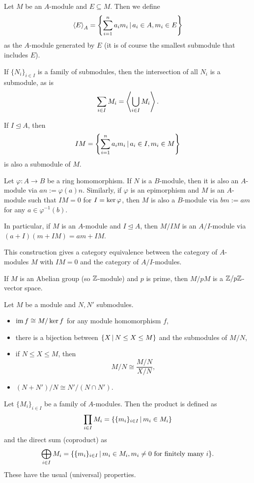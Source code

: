 Let $M$ be an $A$-module and $E \subseteq M$.
Then we define
\[
  \left< E \right>_A = \left\{
	\sum_{i=1}^n a_i m_i \,|\, a_i \in A, m_i \in E
  \right\}
\]
as the $A$-module generated by $E$ (it is of course the smallest submodule that
includes $E$).

If $\{N_i\}_{i\in I}$ is a family of submodules, then the intersection of all
$N_i$ is a submodule, as is
\[
  \sum_{i \in I} M_i = \left< \bigcup_{i \in I} M_i \right>.
\]

If $I \trianglelefteq A$, then
\[
  IM = \left\{
	\sum_{i=1}^n a_i m_i \,|\, a_i \in I, m_i \in M
  \right\}
\]
is also a submodule of $M$.

\begin{remark}
  Let $\varphi: A \to B$ be a ring homomorphism.
  If $N$ is a $B$-module, then it is also an $A$-module via $an := \varphi(a)
  n$.
  Similarly, if $\varphi$ is an epimorphism and $M$ is an $A$-module such that
  $IM = 0$ for $I = \operatorname{ker} \varphi$, then $M$ is also a $B$-module via $bm :=
  am$ for any $a \in \varphi^{-1}(b)$.
\end{remark}

\begin{remark}
  In particular, if $M$ is an $A$-module and $I \trianglelefteq A$, then $M /
  IM$ is an $A/I$-module via $(a+I)(m + IM) = am + IM$.
\end{remark}

\begin{remark}
  This construction gives a category equivalence between the category of
  $A$-modules $M$ with $IM = 0$ and the category of $A/I$-modules.
\end{remark}

\begin{example}
  If $M$ is an Abelian group (so $\mathbb{Z}$-module) and $p$ is prime, then $M/pM$ is a
  $\mathbb{Z}/p\mathbb{Z}$-vector space.
\end{example}

\begin{theorem}
  Let $M$ be a module and $N, N'$ submodules.
  \begin{itemize}
  \item $\operatorname{im} f \cong M / \operatorname{ker} f$ for any module homomorphism $f$,
  \item there is a bijection between $\{ X \,|\, N \le X \le M \}$ and the
	submodules of $M/N$,
  \item if $N \le X \le M$, then
	\[
	  M/N \cong \frac{M/N}{X/N},
	\]
  \item $(N + N')/N \cong N' / (N \cap N')$.
  \end{itemize}
\end{theorem}

Let $\{M_i\}_{i \in I}$ be a family of $A$-modules.
Then the product is defined as
\[
  \prod_{i \in I} M_i = \{ \{m_i\}_{i \in I} \,|\, m_i \in M_i \}
\]
and the direct sum (coproduct) as
\[
  \bigoplus_{i \in I} M_i = \{ \{m_i\}_{i \in I} \,|\, m_i \in M_i, \text{$m_i
	\ne 0$ for finitely many $i$} \}.
\]
These have the usual (universal) properties.

